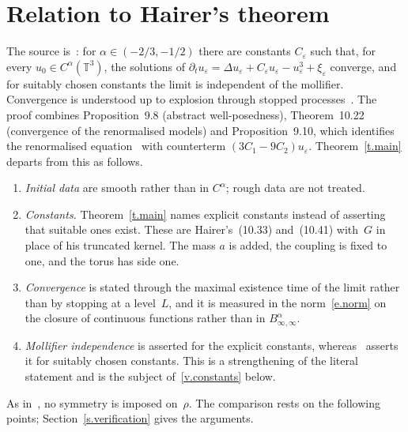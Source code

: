 \documentclass[11pt,letterpaper]{article}
\numberwithin{equation}{section}
\theoremstyle{plain}
\theoremstyle{definition}
\theoremstyle{remark}
\newcommand{\T}{\mathbb{T}^3}
\newcommand{\nf}[2]{#1/#2}
\newcommand{\1}{\mathbf{1}}
\begin{document}
\section{Relation to Hairer's theorem}
\label{s.hairer}

The source is~\cite[Theorem~1.15]{Hai14}: for $\alpha\in(-\nf{2}{3},-\nf{1}{2})$ there are constants $C_\varepsilon$ such that, for every $u_0\in C^\alpha(\T)$, the solutions of $\partial_tu_\varepsilon=\Delta u_\varepsilon+C_\varepsilon u_\varepsilon-u_\varepsilon^3+\xi_\varepsilon$ converge, and for suitably chosen constants the limit is independent of the mollifier. Convergence is understood up to explosion through stopped processes~\cite[Remarks~1.13, 1.16 and~1.18]{Hai14}. The proof combines Proposition~9.8 (abstract well-posedness), Theorem~10.22 (convergence of the renormalised models) and Proposition~9.10, which identifies the renormalised equation~\cite[(9.21)]{Hai14} with counterterm $(3C_1-9C_2)u_\varepsilon$. Theorem~\ref{t.main} departs from this as follows.
\begin{enumerate}[label=\textup{(H\arabic*)}]
\item \emph{Initial data} are smooth rather than in $C^\alpha$; rough data are not treated.
\item \emph{Constants.} Theorem~\ref{t.main} names explicit constants instead of asserting that suitable ones exist. These are Hairer's~(10.33) and~(10.41) with~$G$ in place of his truncated kernel. The mass $a$ is added, the coupling is fixed to one, and the torus has side one.
\item \emph{Convergence} is stated through the maximal existence time of the limit rather than by stopping at a level~$L$, and it is measured in the norm~\eqref{e.norm} on the closure of continuous functions rather than in $B^\alpha_{\infty,\infty}$.
\item \emph{Mollifier independence} is asserted for the explicit constants, whereas~\cite{Hai14} asserts it for suitably chosen constants. This is a strengthening of the literal statement and is the subject of~\ref{v.constants} below.
\end{enumerate}
As in~\cite[\S10.5]{Hai14}, no symmetry is imposed on~$\rho$. The comparison rests on the following points; Section~\ref{s.verification} gives the arguments.
\end{document}
